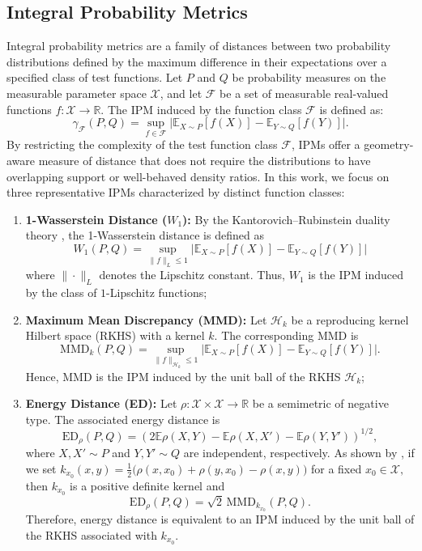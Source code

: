 \documentclass[twoside,11pt]{article}
\begin{document}
\subsection{Integral Probability Metrics}
Integral probability metrics are a family of distances between two probability distributions defined by the maximum difference in their expectations over a specified class of test functions. Let $P$ and $Q$ be probability measures on the measurable parameter space $\mathcal{X}$, and let $\mathcal{F}$ be a set of measurable real-valued functions $f: \mathcal{X} \to \mathbb{R}$. The IPM induced by the function class $\mathcal{F}$ is defined as:
\begin{equation*}
    \gamma_{\mathcal{F}}(P, Q) = \sup_{f \in \mathcal{F}} \big| \mathbb{E}_{X \sim P}[f(X)] - \mathbb{E}_{Y \sim Q}[f(Y)] \big|.
\end{equation*}
By restricting the complexity of the test function class $\mathcal{F}$, IPMs offer a geometry-aware measure of distance that does not require the distributions to have overlapping support or well-behaved density ratios. In this work, we focus on three representative IPMs characterized by distinct function classes:
\begin{enumerate}
    \item \textbf{1-Wasserstein Distance ($W_1$):} By the Kantorovich--Rubinstein duality theory \citep{hanin1992kantorovich}, the 1-Wasserstein distance is defined as 
    \[W_1(P,Q)=\sup_{\|f\|_L\leq 1} \big|\mathbb{E}_{X \sim P}[f(X)] - \mathbb{E}_{Y \sim Q}[f(Y)]\big| \]
    where $\|\cdot\|_L$ denotes the Lipschitz constant. Thus, \(W_1\) is the IPM induced by the class of \(1\)-Lipschitz functions;
    \item \textbf{Maximum Mean Discrepancy (MMD):} Let \(\mathcal{H}_k\) be a reproducing kernel Hilbert space (RKHS) \citep{smola2007hilbert} with a kernel \(k\). The corresponding MMD is
    \[\mathrm{MMD}_k(P,Q)=\sup_{\|f\|_{\mathcal{H}_k}\leq 1} \big|\mathbb{E}_{X \sim P}[f(X)] - \mathbb{E}_{Y \sim Q}[f(Y)]\big|.\]
    Hence, MMD is the IPM induced by the unit ball of the RKHS \(\mathcal{H}_k\);
    \item \textbf{Energy Distance (ED):} Let \(\rho:\mathcal{X}\times\mathcal{X}\to\mathbb{R}\) be a semimetric of negative type. The associated energy distance is
    \[
    \mathrm{ED}_{\rho}(P,Q)
    =
    \left(
    2\mathbb{E}\rho(X,Y)
    -
    \mathbb{E}\rho(X,X')
    -
    \mathbb{E}\rho(Y,Y')
    \right)^{1/2},
    \]
    where \(X,X'\sim P\) and \(Y,Y'\sim Q\) are independent, respectively. As shown by \citet{sejdinovic2013equivalence}, if we set $k_{x_0}(x,y)=\frac{1}{2}\bigl(\rho(x,x_0)+\rho(y,x_0)-\rho(x,y)\bigr)$ for a fixed $ x_0\in\mathcal{X},
    $
    then \(k_{x_0}\) is a positive definite kernel and
    \[
    \mathrm{ED}_{\rho}(P,Q)
    =
    \sqrt{2}\,\mathrm{MMD}_{k_{x_0}}(P,Q).
    \]
    Therefore, energy distance is equivalent to an IPM induced by the unit ball of the RKHS associated with \(k_{x_0}\).
\end{enumerate}
\end{document}
